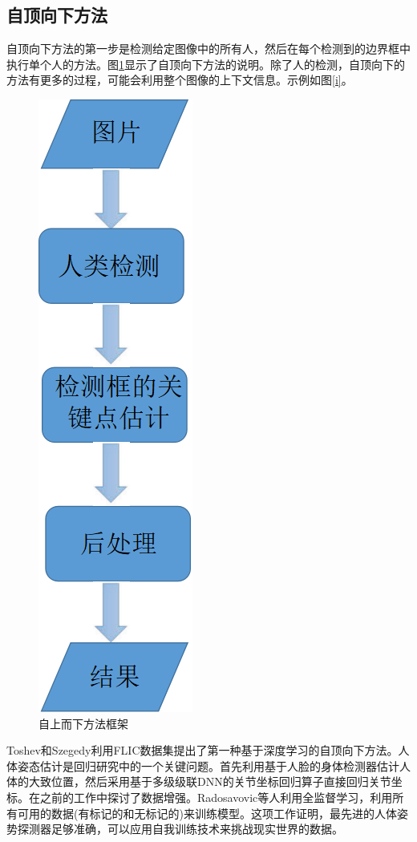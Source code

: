 \documentclass[hyperref]{ctexart}
\begin{document}
\begin{multicols}{2}
		\subsection{自顶向下方法}
		自顶向下方法的第一步是检测给定图像中的所有人，然后在每个检测到的边界框中执行单个人的方法。图\ref{g}显示了自顶向下方法的说明。除了人的检测，自顶向下的方法有更多的过程，可能会利用整个图像的上下文信息。示例如图\ref{i}。
		\begin{figure}[H]
			\centering
			\includegraphics[scale = 0.63]{8}
			\caption{自上而下方法框架}
			\label{g}
		\end{figure}
		
		Toshev和Szegedy\cite{toshev2014deeppose}利用FLIC数据集\cite{sapp2013modec}提出了第一种基于深度学习的自顶向下方法。人体姿态估计是回归研究中的一个关键问题。首先利用基于人脸的身体检测器估计人体的大致位置，然后采用基于多级级联DNN的关节坐标回归算子直接回归关节坐标。在之前的工作\cite{radosavovic2018data}中探讨了数据增强。Radosavovic等人\cite{radosavovic2018data}利用全监督学习，利用所有可用的数据(有标记的和无标记的)来训练模型。这项工作证明，最先进的人体姿势探测器足够准确，可以应用自我训练技术来挑战现实世界的数据。
		

\end{multicols}
\end{document}
